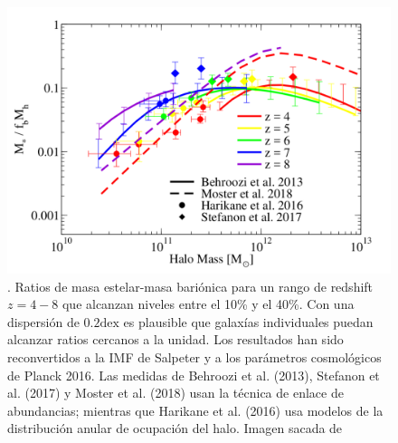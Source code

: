\begin{figure}[t]
\centering
\includegraphics[scale=0.5]{Figures/Behroozi-silk_2010_fig1}
\caption{\label{fig:beh-silk-2010-fig1}. Ratios de masa estelar-masa bariónica para un rango de redshift $z= 4-8$ que alcanzan niveles entre el 10\% y el 40\%. Con una dispersión de $0.2\mathrm{dex}$ es plausible que galaxías individuales puedan alcanzar ratios cercanos a la unidad. Los resultados han sido reconvertidos a la IMF de Salpeter y a los parámetros cosmológicos de Planck 2016. Las medidas de Behroozi et al. (2013), Stefanon et al. (2017) y Moster et al. (2018) usan la técnica de enlace de abundancias; mientras que Harikane et al. (2016) usa modelos de la distribución anular de ocupación del halo. Imagen sacada de \cite{behroozi2018mostmassive}}
\end{figure}


